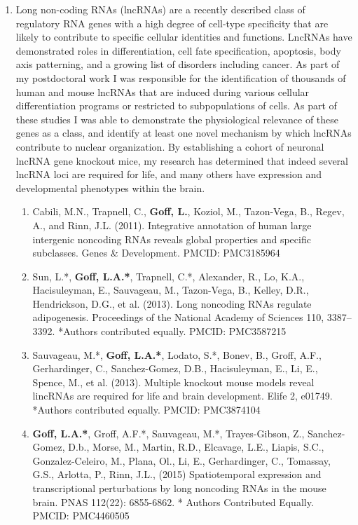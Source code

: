 \documentclass{nihbiosketch}
\begin{document}
\begin{enumerate}
\begin{enumerate}
\end{enumerate}


\item Long non-coding RNAs (lncRNAs) are a recently described class of regulatory RNA genes with a high degree of cell-type specificity that are likely to contribute to specific cellular identities and functions.  LncRNAs have demonstrated roles in differentiation, cell fate specification, apoptosis, body axis patterning, and a growing list of disorders including cancer. As part of my postdoctoral work I was responsible for the identification of thousands of human and mouse lncRNAs that are induced during various cellular differentiation programs or restricted to subpopulations of cells. As part of these studies I was able to demonstrate the physiological relevance of these genes as a class, and identify at least one novel mechanism by which lncRNAs contribute to nuclear organization. By establishing a cohort of neuronal lncRNA gene knockout mice, my research has determined that indeed several lncRNA loci are required for life, and many others have expression and developmental phenotypes within the brain.     

\begin{enumerate}

\item	 Cabili, M.N., Trapnell, C., \textbf{Goff, L.}, Koziol, M., Tazon-Vega, B., Regev, A., and Rinn, J.L. (2011). Integrative annotation of human large intergenic noncoding RNAs reveals global properties and specific subclasses. Genes \& Development. PMCID: PMC3185964

\item	Sun, L.*, \textbf{Goff, L.A.*}, Trapnell, C.*, Alexander, R., Lo, K.A., Hacisuleyman, E., Sauvageau, M., Tazon-Vega, B., Kelley, D.R., Hendrickson, D.G., et al. (2013). Long noncoding RNAs regulate adipogenesis. Proceedings of the National Academy of Sciences 110, 3387–3392. *Authors contributed equally. PMCID: PMC3587215

\item	Sauvageau, M.*, \textbf{Goff, L.A.*}, Lodato, S.*, Bonev, B., Groff, A.F., Gerhardinger, C., Sanchez-Gomez, D.B., Hacisuleyman, E., Li, E., Spence, M., et al. (2013). Multiple knockout mouse models reveal lincRNAs are required for life and brain development. Elife 2, e01749. *Authors contributed equally. PMCID: PMC3874104

\item	\textbf{Goff, L.A.*}, Groff, A.F.*, Sauvageau, M.*, Trayes-Gibson, Z., Sanchez-Gomez, D.b., Morse, M., Martin, R.D., Elcavage, L.E., Liapis, S.C., Gonzalez-Celeiro, M., Plana, Ol., Li, E., Gerhardinger, C., Tomassay, G.S., Arlotta, P., Rinn, J.L., (2015) Spatiotemporal expression and transcriptional perturbations by long noncoding RNAs in the mouse brain. PNAS 112(22): 6855-6862. * Authors Contributed Equally. PMCID: PMC4460505


\end{enumerate}
\end{enumerate}
\end{document}
